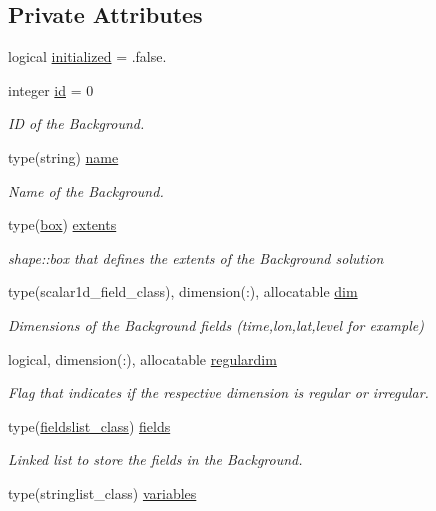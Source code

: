 \subsection*{Private Attributes}
\begin{DoxyCompactItemize}
\item 
logical \mbox{\hyperlink{structbackground__mod_1_1background__class_aeb3f1a195165888bc63066aed03d651b}{initialized}} = .false.
\item 
integer \mbox{\hyperlink{structbackground__mod_1_1background__class_a1b3eabdda94ffdb97b6bb0db385edfd8}{id}} = 0
\begin{DoxyCompactList}\small\item\em ID of the Background. \end{DoxyCompactList}\item 
type(string) \mbox{\hyperlink{structbackground__mod_1_1background__class_a4f812fd2adfe5d1e50db63e75e460022}{name}}
\begin{DoxyCompactList}\small\item\em Name of the Background. \end{DoxyCompactList}\item 
type(\mbox{\hyperlink{structgeometry__mod_1_1box}{box}}) \mbox{\hyperlink{structbackground__mod_1_1background__class_acaaef54168dbee2731a99d0852844844}{extents}}
\begin{DoxyCompactList}\small\item\em shape\+::box that defines the extents of the Background solution \end{DoxyCompactList}\item 
type(scalar1d\+\_\+field\+\_\+class), dimension(\+:), allocatable \mbox{\hyperlink{structbackground__mod_1_1background__class_a086f319ce4f039190699578d69927013}{dim}}
\begin{DoxyCompactList}\small\item\em Dimensions of the Background fields (time,lon,lat,level for example) \end{DoxyCompactList}\item 
logical, dimension(\+:), allocatable \mbox{\hyperlink{structbackground__mod_1_1background__class_a78b62368ed110d33fd809e8ff101839b}{regulardim}}
\begin{DoxyCompactList}\small\item\em Flag that indicates if the respective dimension is regular or irregular. \end{DoxyCompactList}\item 
type(\mbox{\hyperlink{structbackground__mod_1_1fieldslist__class}{fieldslist\+\_\+class}}) \mbox{\hyperlink{structbackground__mod_1_1background__class_a68b750f0476dc75b886638a45a45f8f6}{fields}}
\begin{DoxyCompactList}\small\item\em Linked list to store the fields in the Background. \end{DoxyCompactList}\item 
type(stringlist\+\_\+class) \mbox{\hyperlink{structbackground__mod_1_1background__class_af6524c71d9bc6c9b4226fe6e362f04fd}{variables}}
\end{DoxyCompactItemize}


